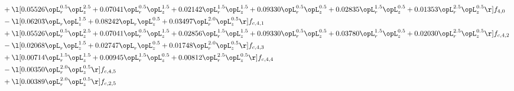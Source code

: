 \begin{alignat}{2}
& + \l[  0.05526 \opL_r^{0.5} \opL_z^{2.5} +  0.07041 \opL_r^{0.5} \opL_z^{1.5} +  0.02142 \opL_r^{1.5} \opL_z^{1.5} +  0.09330 \opL_r^{0.5} \opL_z^{0.5} +  0.02835 \opL_r^{1.5} \opL_z^{0.5} +  0.01353 \opL_r^{2.5} \opL_z^{0.5}  \r] f_{4,0} \nonumber \\ 
& - \l[  0.06203 \opL_r \opL_z^{1.5} +  0.08242 \opL_r \opL_z^{0.5} +  0.03497 \opL_r^{2.0} \opL_z^{0.5}  \r] f_{c,4,1} \nonumber \\ 
& + \l[  0.05526 \opL_r^{0.5} \opL_z^{2.5} +  0.07041 \opL_r^{0.5} \opL_z^{1.5} +  0.02856 \opL_r^{1.5} \opL_z^{1.5} +  0.09330 \opL_r^{0.5} \opL_z^{0.5} +  0.03780 \opL_r^{1.5} \opL_z^{0.5} +  0.02030 \opL_r^{2.5} \opL_z^{0.5}  \r] f_{c,4,2} \nonumber \\ 
& - \l[  0.02068 \opL_r \opL_z^{1.5} +  0.02747 \opL_r \opL_z^{0.5} +  0.01748 \opL_r^{2.0} \opL_z^{0.5}  \r] f_{c,4,3} \nonumber \\ 
& + \l[  0.00714 \opL_r^{1.5} \opL_z^{1.5} +  0.00945 \opL_r^{1.5} \opL_z^{0.5} +  0.00812 \opL_r^{2.5} \opL_z^{0.5}  \r] f_{c,4,4} \nonumber \\ 
& - \l[  0.00350 \opL_r^{2.0} \opL_z^{0.5}  \r] f_{c,4,5} \nonumber \\ 
& + \l[  0.00389 \opL_r^{2.0} \opL_z^{0.5}  \r] f_{c,2,5} \nonumber \\ 
\end{alignat} 



